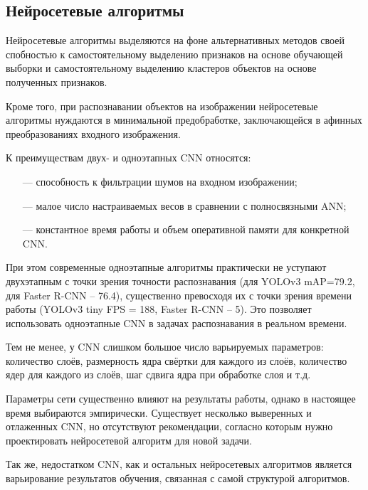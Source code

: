 \subsection*{Нейросетевые алгоритмы}

Нейросетевые алгоритмы выделяются на фоне альтернативных методов своей спобностью к самостоятельному выделению признаков на основе обучающей выборки и самостоятельному выделению кластеров объектов на основе полученных признаков.

Кроме того, при распознавании объектов на изображении нейросетевые алгоритмы нуждаются в минимальной предобработке, заключающейся в афинных преобразованиях входного изображения.

К преимуществам двух- и одноэтапных CNN относятся:
\begin{itemize}
    \item[---] способность к фильтрации шумов на входном изображении;
    \item[---] малое число настраиваемых весов в сравнении с полносвязными ANN;
    \item[---] константное время работы и объем оперативной памяти для конкретной CNN.
\end{itemize}

При этом современные одноэтапные алгоритмы практически не уступают двухэтапным с точки зрения точности распознавания (для YOLOv3 mAP=79.2, для Faster R-CNN -- 76.4), существенно превосходя их с точки зрения времени работы (YOLOv3 tiny FPS = 188, Faster R-CNN -- 5). Это позволяет использовать одноэтапные CNN в задачах распознавания в реальном времени.

Тем не менее, у CNN слишком большое число варьируемых параметров: количество слоёв, размерность ядра свёртки для каждого из слоёв, количество ядер для каждого из слоёв, шаг сдвига ядра при обработке слоя и т.д. 

Параметры сети существенно влияют на результаты работы, однако в настоящее время выбираются эмпирически. Существует несколько выверенных и отлаженных CNN, но отсутствуют рекомендации, согласно которым нужно проектировать нейросетевой алгоритм для новой задачи.

Так же, недостатком CNN, как и остальных нейросетевых алгоритмов является варьирование результатов обучения, связанная с самой структурой алгоритмов.